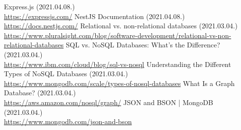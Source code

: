 \documentclass[
]{thesis-ekf}
\theoremstyle{definition}
\theoremstyle{remark}
\begin{document}
\begin{thebibliography}{10}
Express.js (2021.04.08.)
\\\url{https://expressjs.com/}
NestJS Documentation (2021.04.08.)
\\\url{https://docs.nestjs.com/}
Relational vs. non-relational databases (2021.03.04.)
\\\url{https://www.pluralsight.com/blog/software-development/relational-vs-non-relational-databases}
SQL vs. NoSQL Databases: What's the Difference? (2021.03.04.)
\\\url{https://www.ibm.com/cloud/blog/sql-vs-nosql}
Understanding the Different Types of NoSQL Databases (2021.03.04.)
\\\url{https://www.mongodb.com/scale/types-of-nosql-databases}
What Is a Graph Database? (2021.03.04.)
\\\url{https://aws.amazon.com/nosql/graph/}
JSON and BSON | MongoDB (2021.03.04.)
\\\url{https://www.mongodb.com/json-and-bson}
\end{thebibliography}

\end{document}
